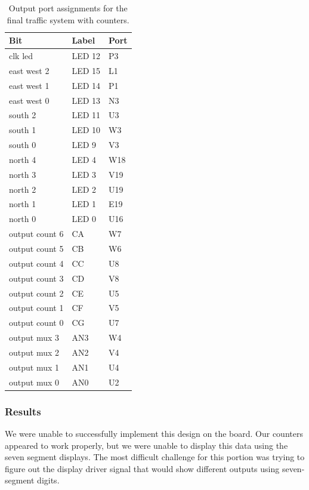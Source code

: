 \documentclass[11pt]{article}
\begin{document}
\begin{table}[H]
\begin{center}
\begin{tabular}{| l | l | l |}
	\hline
	Bit & Label & Port \\ \hline
	clk led & LED 12 & P3 \\ \hline
	east west 2 & LED 15 & L1 \\ \hline
	east west 1 & LED 14 & P1 \\ \hline
	east west 0 & LED 13 & N3 \\ \hline
	south 2 & LED 11 & U3 \\ \hline
	south 1 & LED 10 & W3 \\ \hline
	south 0 & LED 9 & V3 \\ \hline
	north 4 & LED 4 & W18 \\ \hline
	north 3 & LED 3 & V19 \\ \hline
	north 2 & LED 2 & U19 \\ \hline
	north 1 & LED 1 & E19 \\ \hline
	north 0 & LED 0 & U16 \\ \hline
	output count 6 & CA & W7 \\ \hline
	output count 5 & CB & W6 \\ \hline
	output count 4 & CC & U8 \\ \hline
	output count 3 & CD & V8 \\ \hline
	output count 2 & CE & U5 \\ \hline
	output count 1 & CF & V5 \\ \hline
	output count 0 & CG & U7 \\ \hline
	output mux 3 & AN3 & W4 \\ \hline
	output mux 2 & AN2 & V4 \\ \hline
	output mux 1 & AN1 & U4 \\ \hline
	output mux 0 & AN0 & U2 \\ \hline
\end{tabular}
\caption{\label{tab:part3_output_ports}Output port assignments for the final traffic system with counters.}
\end{center}
\end{table}

\subsubsection{Results}
We were unable to successfully implement this design on the board. Our counters appeared to work properly, but we were unable to display this data using the seven segment displays. The most difficult challenge for this portion was trying to figure out the display driver signal that would show different outputs using seven-segment digits.
\end{document}
